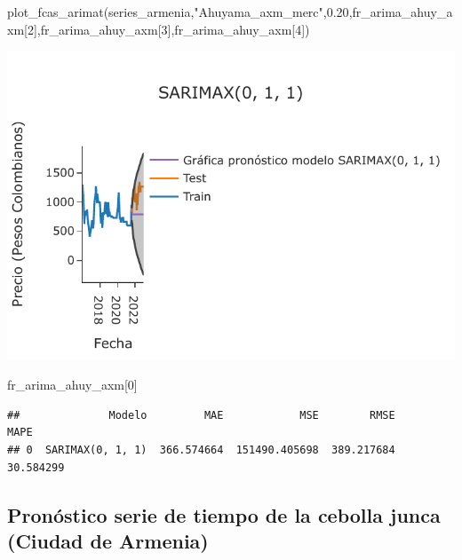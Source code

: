 \documentclass[
]{book}
\newenvironment{Shaded}{\begin{snugshade}}{\end{snugshade}}
\newcommand{\DecValTok}[1]{\textcolor[rgb]{0.00,0.00,0.81}{#1}}
\newcommand{\FloatTok}[1]{\textcolor[rgb]{0.00,0.00,0.81}{#1}}
\newcommand{\NormalTok}[1]{#1}
\newcommand{\StringTok}[1]{\textcolor[rgb]{0.31,0.60,0.02}{#1}}
\begin{document}
\begin{Shaded}
\begin{Highlighting}[]

\NormalTok{plot\_fcas\_arimat(series\_armenia,}\StringTok{"Ahuyama\_axm\_merc"}\NormalTok{,}\FloatTok{0.20}\NormalTok{,fr\_arima\_ahuy\_axm[}\DecValTok{2}\NormalTok{],fr\_arima\_ahuy\_axm[}\DecValTok{3}\NormalTok{],fr\_arima\_ahuy\_axm[}\DecValTok{4}\NormalTok{])}
\end{Highlighting}
\end{Shaded}

\includegraphics{bookdown-demo_files/figure-latex/unnamed-chunk-149-137.pdf}

\begin{Shaded}
\begin{Highlighting}[]

\NormalTok{fr\_arima\_ahuy\_axm[}\DecValTok{0}\NormalTok{]}
\end{Highlighting}
\end{Shaded}

\begin{verbatim}
##              Modelo         MAE            MSE        RMSE       MAPE
## 0  SARIMAX(0, 1, 1)  366.574664  151490.405698  389.217684  30.584299
\end{verbatim}

\hypertarget{pronuxf3stico-serie-de-tiempo-de-la-cebolla-junca-ciudad-de-armenia-1}{%
\subsection{Pronóstico serie de tiempo de la cebolla junca (Ciudad de Armenia)}\label{pronuxf3stico-serie-de-tiempo-de-la-cebolla-junca-ciudad-de-armenia-1}}
\end{document}

